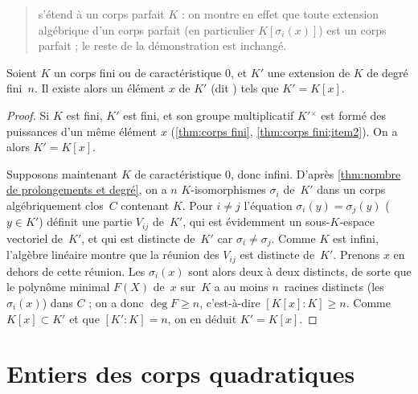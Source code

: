 \documentclass[11pt, %
  title in boldface,
  theorem in new line,
  theorem numbering = section,
  number theorems separately,
  simple name,
]{beaulivre}
\begin{document}
    \begin{quote}
         s'étend à un corps parfait \( K \) : on montre en effet que toute extension algébrique d'un corps parfait (en particulier \( K[\sigma_i(x)] \)) est un corps parfait ; le reste de la démonstration est inchangé.
    \end{quote}

    \begin{corollary}\label{cor:théorème de l'élément primitif}
        Soient \( K \) un corps fini ou de caractéristique \( 0 \), et \( K' \) une extension de \( K \) de degré fini~\( n \). Il existe alors un élément \( x \) de \( K' \) (dit ) tels que \( K' = K[x] \).
    \end{corollary}
    \begin{proof}
        Si \( K \) est fini, \( K' \) est fini, et son groupe multiplicatif \( K'{}^\times \) est formé des puissances d'un même élément \( x \) (\cref{thm:corps fini}, \ref{thm:corps fini;item2}). On a alors \( K' = K[x] \).

        Supposons maintenant \( K \) de caractéristique \( 0 \), donc infini. D'après \cref{thm:nombre de prolongements et degré}, on a \( n \) \( K \)‑isomorphismes \( \sigma_i \) de~\( K' \) dans un corps algébriquement clos~\( C \) contenant \( K \). Pour \( i \neq j \) l'équation \( \sigma_i(y) = \sigma_j(y) \) (\( y \in K' \)) définit une partie \( V_{ij} \) de~\( K' \), qui est évidemment un sous-\( K \)‑espace vectoriel de~\( K' \), et qui est distincte de~\( K' \) car \( \sigma_i \neq \sigma_j \). Comme \( K \) est infini, l'algèbre linéaire montre que la réunion des \( V_{ij} \) est distincte de~\( K' \). Prenons \( x \) en dehors de cette réunion. Les \( \sigma_i(x) \) sont alors deux à deux distincts, de sorte que le polynôme minimal \( F(X) \) de~\( x \) sur~\( K \) a au moins \( n \)~racines distincts (les \( \sigma_i(x) \)) dans \( C \) ; on a donc \( \deg F \geqslant n \), c'est-à-dire \( [K[x]:K] \geqslant n \). Comme \( K[x] \subset K' \) et que \( [K':K] = n \), on en déduit \( K' = K[x] \).
    \end{proof}

\section{Entiers des corps quadratiques}\label{sec:entiers des corps quadratiques}
\end{document}
